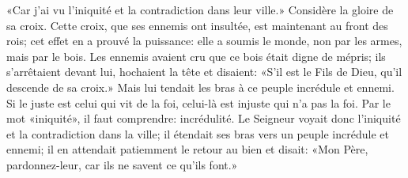 «Car j’ai vu l’iniquité et la contradiction dans leur ville.»
Considère la gloire de sa croix.
Cette croix, que ses ennemis ont insultée, est maintenant au front des rois;
	cet effet en a prouvé la puissance:
	elle a soumis le monde, non par les armes, mais par le bois.
Les ennemis avaient cru que ce bois était digne de mépris;
	ils s’arrêtaient devant lui, hochaient la tête et disaient:
	«S’il est le Fils de Dieu, qu’il descende de sa croix.»
Mais lui tendait les bras à ce peuple incrédule et ennemi.
Si le juste est celui qui vit de la foi,
	celui-là est injuste qui n’a pas la foi.
Par le mot «iniquité», il faut comprendre: incrédulité.
Le Seigneur voyait donc l’iniquité et la contradiction dans la ville;
	il étendait ses bras vers un peuple incrédule et ennemi;
	il en attendait patiemment le retour au bien et disait:
	«Mon Père, pardonnez-leur, car ils ne savent ce qu’ils font.»
